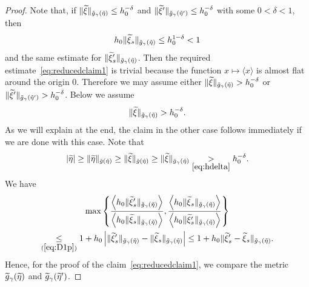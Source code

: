 \documentclass[AHL,Unicode,longabstracts,published]{cedram}
\newcommand*\ineq[1]{\underset{(#1)}{\leq}}
\let\oldtilde\tilde
\renewcommand*{\tilde}[1]{\mathchoice{\widetilde{#1}}{\widetilde{#1}}{\oldtilde{#1}}{\oldtilde{#1}}}
\begin{document}
\begin{proof}
Note that, if $\|\tilde{\xi}\|_{\tilde{g}_{\gamma}(\tilde{\eta})}\le h_{0}^{-\delta}$ and $\|\tilde{\xi}'\|_{\tilde{g}_{\gamma}(\tilde{\eta}')}\le h_{0}^{-\delta}$ with some $0<\delta<1$, then
\[
h_{0}\|\tilde{\xi}_{s}\|_{\tilde{g}_{\gamma}\left(\tilde{\eta}\right)}\le h_{0}^{1-\delta}<1
\]
and the same estimate for $\|\tilde{\xi}'_{s}\|_{\tilde{g}_{\gamma}(\tilde{\eta})}$. Then the required estimate~\eqref{eq:reducedclaim1} is trivial because the function $x\mapsto\langle x\rangle$ is almost flat around the origin $0$. Therefore we may assume either $\|\tilde{\xi}\|_{\tilde{g}_{\gamma}(\tilde{\eta})}>h_{0}^{-\delta}$ or $\|\tilde{\xi}'\|_{\tilde{g}_{\gamma}(\tilde{\eta}')}>h_{0}^{-\delta}$. Below we assume
\begin{equation}\label{eq:hdelta}
\|\tilde{\xi}\|_{\tilde{g}_{\gamma}\left(\tilde{\eta}\right)}>h_{0}^{-\delta}.
\end{equation}
As we will explain at the end, the claim in the other case follows immediately if we are done with this case. Note that
\begin{equation}\label{eq:eta}
|\tilde{\eta}|\ge\|\tilde{\eta}\|_{\tilde{g}\left(\tilde{\eta}\right)}\ge\|\tilde{\xi}\|_{\tilde{g}\left(\tilde{\eta}\right)}\ge\|\tilde{\xi}\|_{\tilde{g}_{\gamma}\left(\tilde{\eta}\right)}\underset{\eqref{eq:hdelta}}{>}h_{0}^{-\delta}.
\end{equation}
We have
\begin{multline}\label{eq:basic}
\max\left\{ \frac{\left\langle h_{0}\|\tilde{\xi}'_{s}\|_{\tilde{g}_{\gamma}\left(\tilde{\eta}\right)}\right\rangle}{\left\langle h_{0}\|\tilde{\xi}_{s}\|_{\tilde{g}_{\gamma}\left(\tilde{\eta}\right)}\right\rangle},\frac{\left\langle h_{0}\|\tilde{\xi}_{s}\|_{\tilde{g}_{\gamma}\left(\tilde{\eta}\right)}\right\rangle}{\left\langle h_{0}\|\tilde{\xi}'_{s}\|_{\tilde{g}_{\gamma}\left(\tilde{\eta}\right)}\right\rangle}\right\}\\
\ineq{\ref{eq:D1p}}1+h_{0}\left|\|\tilde{\xi}'_{s}\|_{\tilde{g}_{\gamma}\left(\tilde{\eta}\right)}-\|\tilde{\xi}{}_{s}\|_{\tilde{g}_{\gamma}\left(\tilde{\eta}\right)}\right|\le1+h_{0}\|\tilde{\xi}'_{s}-\tilde{\xi}_{s}\|_{\tilde{g}_{\gamma}\left(\tilde{\eta}\right)}.
\end{multline}
Hence, for the proof of the claim~\eqref{eq:reducedclaim1}, we compare the metric $\tilde{g}_{\gamma}(\tilde{\eta})$ and $\tilde{g}_{\gamma}(\tilde{\eta}')$.


\end{proof}
\end{document}
